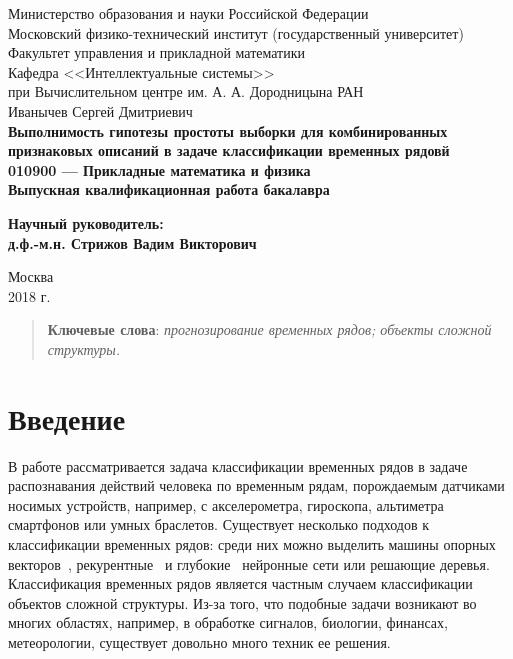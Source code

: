 \documentclass[12pt,fleqn,unicode]{article}
\begin{document}
{
\renewcommand{\baselinestretch}{1}
\thispagestyle{empty}
\begin{center}
    \sc
        Министерство образования и науки Российской Федерации\\
        Московский физико-технический институт
        {\rm(государственный университет)}\\
        Факультет управления и прикладной математики\\
        Кафедра <<Интеллектуальные системы>>\\
        при Вычислительном центре им. А. А. Дородницына РАН\\[35mm]
    \rm\large
        Иванычев Сергей Дмитриевич\\[10mm]
    \bf\Large
    Выполнимость гипотезы простоты выборки для комбинированных
признаковых описаний в задаче классификации временных рядовй\\[10mm]
    \rm\normalsize
        010900 — Прикладные математика и физика\\[10mm]
    \sc
        Выпускная квалификационная работа бакалавра\\[30mm]
\end{center}
\hfill\parbox{80mm}{
    \begin{flushleft}
    \bf
        Научный руководитель:\\
    \rm
        д.ф.-м.н. Стрижов Вадим Викторович\\[4.9cm]
    \end{flushleft}
}
\begin{center}
    Москва\\
    2018 г.
\end{center}
}

\newpage
\tableofcontents

\newpage
\begin{abstract}


  \bigskip
    \textbf{Ключевые слова}: \emph{прогнозирование временных рядов; объекты сложной структуры.}
\end{abstract}

\newpage
\section{Введение}

В работе рассматривается задача классификации временных рядов в задаче
распознавания действий человека по временным рядам,
порождаемым датчиками носимых устройств, например, с акселерометра, гироскопа,
альтиметра смартфонов или умных браслетов. Существует несколько подходов к
классификации временных рядов: среди них можно выделить машины опорных
векторов~\cite{Kampouraki2009, Eads2002},
рекурентные~\cite{Husken2003} и глубокие~\cite{Zheng2014} нейронные сети или
решающие деревья.
Классификация временных рядов является частным случаем классификации
объектов сложной структуры. Из-за того, что подобные задачи возникают во
многих областях, например, в обработке сигналов, биологии, финансах,
метеорологии, существует довольно много техник ее решения.
\end{document}
